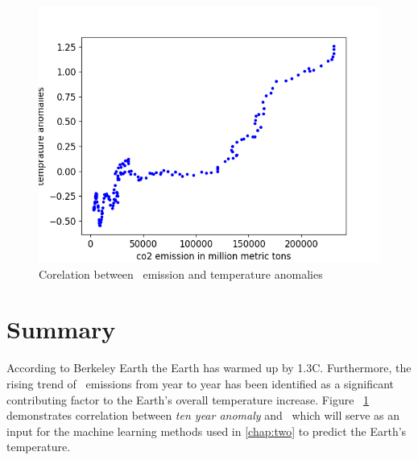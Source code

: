 \begin{figure}[H]
  \includegraphics[width=\linewidth]{img/co2-temperature-corelation.png}
  \caption{Corelation between \coo\ emission and temperature anomalies}
  \label{fig:co2-temperature-corelation}
\end{figure}

\section{Summary}
According to Berkeley Earth \cite{berkeleyearthdata} the Earth has warmed up by 1.3\degree C.
Furthermore, the rising trend of \coo\ emissions from year to year has been identified as a significant contributing factor to the Earth's overall temperature increase. 
Figure ~\ref{fig:co2-temperature-corelation} demonstrates correlation between \textit{ten year anomaly} and \coo\ which will serve as an input for the machine learning methods used in \autoref{chap:two} to predict the Earth's temperature.
